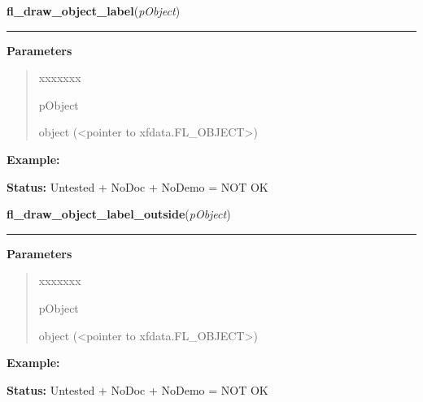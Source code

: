 \hspace{.8\funcindent}\begin{boxedminipage}{\funcwidth}

    \raggedright \textbf{fl\_draw\_object\_label}(\textit{pObject})

    \vspace{-1.5ex}

    \rule{\textwidth}{0.5\fboxrule}
\setlength{\parskip}{2ex}
\setlength{\parskip}{1ex}
      \textbf{Parameters}
      \vspace{-1ex}

      \begin{quote}
        \begin{Ventry}{xxxxxxx}

          \item[pObject]

          object ({\textless}pointer to xfdata.FL\_OBJECT{\textgreater})

        \end{Ventry}

      \end{quote}

\textbf{Example:} 

\textbf{Status:} Untested + NoDoc + NoDemo = NOT OK



    \end{boxedminipage}

    \label{xformslib:library:fl_draw_object_label_outside}

    \vspace{0.5ex}

\hspace{.8\funcindent}\begin{boxedminipage}{\funcwidth}

    \raggedright \textbf{fl\_draw\_object\_label\_outside}(\textit{pObject})

    \vspace{-1.5ex}

    \rule{\textwidth}{0.5\fboxrule}
\setlength{\parskip}{2ex}
\setlength{\parskip}{1ex}
      \textbf{Parameters}
      \vspace{-1ex}

      \begin{quote}
        \begin{Ventry}{xxxxxxx}

          \item[pObject]

          object ({\textless}pointer to xfdata.FL\_OBJECT{\textgreater})

        \end{Ventry}

      \end{quote}

\textbf{Example:} 

\textbf{Status:} Untested + NoDoc + NoDemo = NOT OK



    \end{boxedminipage}

